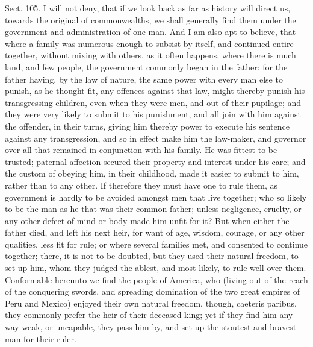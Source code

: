 \documentclass[11pt,openany]{book}
\begin{document}
Sect. 105. I will not deny, that if we look back as far as history will direct us, towards the original of commonwealths, we shall generally find them under the government and administration of one man. And I am also apt to believe, that where a family was numerous enough to subsist by itself, and continued entire together, without mixing with others, as it often happens, where there is much land, and few people, the government commonly began in the father: for the father having, by the law of nature, the same power with every man else to punish, as he thought fit, any offences against that law, might thereby punish his transgressing children, even when they were men, and out of their pupilage; and they were very likely to submit to his punishment, and all join with him against the offender, in their turns, giving him thereby power to execute his sentence against any transgression, and so in effect make him the law-maker, and governor over all that remained in conjunction with his family. He was fittest to be trusted; paternal affection secured their property and interest under his care; and the custom of obeying him, in their childhood, made it easier to submit to him, rather than to any other. If therefore they must have one to rule them, as government is hardly to be avoided amongst men that live together; who so likely to be the man as he that was their common father; unless negligence, cruelty, or any other defect of mind or body made him unfit for it? But when either the father died, and left his next heir, for want of age, wisdom, courage, or any other qualities, less fit for rule; or where several families met, and consented to continue together; there, it is not to be doubted, but they used their natural freedom, to set up him, whom they judged the ablest, and most likely, to rule well over them. Conformable hereunto we find the people of America, who (living out of the reach of the conquering swords, and spreading domination of the two great empires of Peru and Mexico) enjoyed their own natural freedom, though, caeteris paribus, they commonly prefer the heir of their deceased king; yet if they find him any way weak, or uncapable, they pass him by, and set up the stoutest and bravest man for their ruler.
\end{document}
